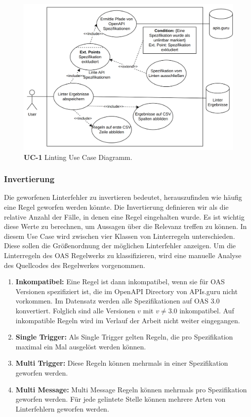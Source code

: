 \begin{figure}[htbp]
  \centering
  \includegraphics[width=1\linewidth]{img/linting.png}
  \caption{\textbf{UC-1} Linting Use Case Diagramm.}
  \label{fig:UC1}
\end{figure}


\subsubsection{Invertierung} \label{sec:invertierung}
Die geworfenen Linterfehler zu invertieren bedeutet, herauszufinden wie häufig eine Regel geworfen werden könnte. Die Invertierung definieren wir als die relative Anzahl der Fälle, in denen eine Regel eingehalten wurde. Es ist wichtig diese Werte zu berechnen, um Aussagen über die Relevanz treffen zu können. In diesem Use Case wird zwischen vier Klassen von Linterregeln unterschieden. Diese sollen die Größenordnung der möglichen Linterfehler anzeigen. Um die Linterregeln des \acs{OAS} Regelwerks zu klassifizieren, wird eine manuelle Analyse des Quellcodes des Regelwerkes vorgenommen.

\begin{enumerate}
  \item \textbf{Inkompatibel:} Eine Regel ist dann inkompatibel, wenn sie für \acs{OAS} Versionen spezifiziert ist, die im OpenAPI Directory von APIs.guru nicht vorkommen. Im Datensatz werden alle Spezifikationen auf \acs{OAS} 3.0 konvertiert. Folglich sind alle Versionen $v$ mit $v \neq 3.0$ inkompatibel. Auf inkompatible Regeln wird im Verlauf der Arbeit nicht weiter eingegangen.
  \item \textbf{Single Trigger:} Als Single Trigger gelten Regeln, die pro Spezifikation maximal ein Mal ausgelöst werden können.
  \item \textbf{Multi Trigger:} Diese Regeln können mehrmals in einer Spezifikation geworfen werden.
  \item \textbf{Multi Message:} Multi Message Regeln können mehrmals pro Spezifikation geworfen werden. Für jede gelintete Stelle können mehrere Arten von Linterfehlern geworfen werden.
\end{enumerate} 

